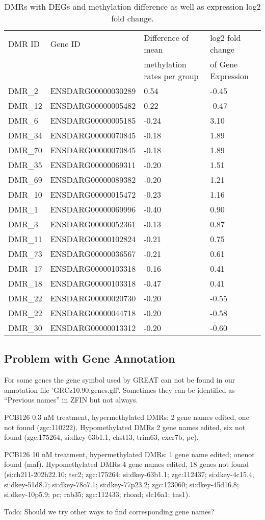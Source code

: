 \documentclass{article}
\newcommand{\TODO}[1]{\begingroup\color{red}Todo: #1\endgroup}
\begin{document}
\begin{table}
  \begin{tabular}{llll}
    DMR ID & Gene ID & Difference of mean  & log2 fold change\\
           &         & methylation rates per group & of Gene Expression \\
    \hline
    DMR\_2 & ENSDARG00000030289 & 0.54 & -0.45\\
    DMR\_12 & ENSDARG00000005482 & 0.22 & -0.47\\
    \hline
    DMR\_6 & ENSDARG00000005185 & -0.24 & 3.10\\
    DMR\_34 & ENSDARG00000070845 & -0.18 & 1.89\\
    DMR\_70 & ENSDARG00000070845 & -0.18 & 1.89\\
    DMR\_35 & ENSDARG00000069311 & -0.20 & 1.51\\
    DMR\_69 & ENSDARG00000089382 & -0.20 & 1.21\\
    DMR\_10 & ENSDARG00000015472 & -0.23 & 1.16\\
    DMR\_1 & ENSDARG00000069996 & -0.40 & 0.90\\
    DMR\_3 & ENSDARG00000052361 & -0.13 & 0.87\\
    DMR\_11 & ENSDARG00000102824 & -0.21 & 0.75\\
    DMR\_73 & ENSDARG00000036567 & -0.21 & 0.61\\
    DMR\_17 & ENSDARG00000103318 & -0.16 & 0.41\\
    DMR\_18 & ENSDARG00000103318 & -0.47 & 0.41\\
    DMR\_22 & ENSDARG00000020730 & -0.20 & -0.55\\
    DMR\_22 & ENSDARG00000044718 & -0.20 & -0.58\\
    DMR\_30 & ENSDARG00000013312 & -0.20 & -0.60\\    
  \end{tabular}
  \caption{DMRs with DEGs and methylation difference as well as
    expression log2 fold change.}
  \label{tab:correlation-10}
\end{table}

\subsection{Problem with Gene Annotation}
For some genes the gene symbol used by GREAT can not be found in our
annotation file 'GRCz10.90.genes.gff'. Sometimes they can be
identified as ``Previous names'' in ZFIN but not always.

PCB126 0.3 nM treatment, hypermethylated DMRs: 2 gene names edited,
one not found (zgc:110222). Hypomethylated DMRs 2 gene names edited,
six not found (zgc:175264, si:dkey-63b1.1, chst13, trim63, cxcr7b,
pc).

PCB126 10 nM treatment, hypermethylated DMRs: 1 gene name edited;
onenot found (maf).  Hypomethylated DMRs 4 gene names edited, 18 genes
not found (si:ch211-202h22.10; tsc2; zgc:175264; si:dkey-63b1.1;
zgc:112437; si:dkey-4c15.4; si:dkey-51d8.7; si:dkey-78o7.1;
si:dkey-77p23.2; zgc:123060; si:dkey-45d16.8; si:dkey-10p5.9; pc;
rab35; zgc:112433; rhoad; slc16a1; tns1).

\TODO{Should we try other ways to find corresponding gene names?}
\end{document}
